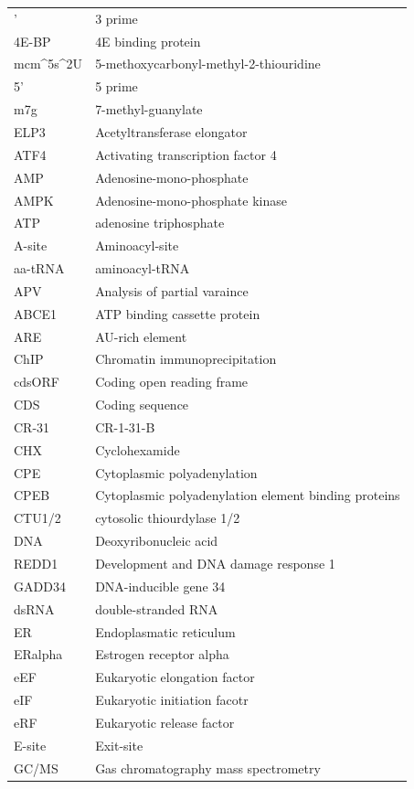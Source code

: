 \documentclass[12pt,openany]{book}
\begin{document}
\begin{longtable}{ll}
\endfoot
\bottomrule
\endlastfoot
3' & 3 prime\\
4E-BP & 4E binding protein\\
mcm\textasciicircum{}5s\textasciicircum{}2U & 5-methoxycarbonyl-methyl-2-thiouridine\\
5' & 5 prime\\
m7g & 7-methyl-guanylate\\
\addlinespace
ELP3 & Acetyltransferase elongator\\
ATF4 & Activating transcription factor 4\\
AMP & Adenosine-mono-phosphate\\
AMPK & Adenosine-mono-phosphate
kinase\\
ATP & adenosine triphosphate\\
\addlinespace
A-site & Aminoacyl-site\\
aa-tRNA & aminoacyl-tRNA\\
APV & Analysis of partial varaince\\
ABCE1 & ATP binding cassette protein\\
ARE & AU-rich element\\
\addlinespace
ChIP & Chromatin immunoprecipitation\\
cdsORF & Coding open reading frame\\
CDS & Coding sequence\\
CR-31 & CR-1-31-B\\
CHX & Cyclohexamide\\
\addlinespace
CPE & Cytoplasmic polyadenylation\\
CPEB & Cytoplasmic polyadenylation element binding proteins\\
CTU1/2 & cytosolic thiourdylase 1/2\\
DNA & Deoxyribonucleic acid\\
REDD1 & Development and
DNA damage response 1\\
\addlinespace
GADD34 & DNA-inducible gene 34\\
dsRNA & double-stranded RNA\\
ER & Endoplasmatic reticulum\\
ERalpha & Estrogen receptor alpha\\
eEF & Eukaryotic elongation factor\\
\addlinespace
eIF & Eukaryotic initiation facotr\\
eRF & Eukaryotic release factor\\
E-site & Exit-site\\
GC/MS & Gas chromatography
mass spectrometry\\

\end{longtable}
\end{document}
